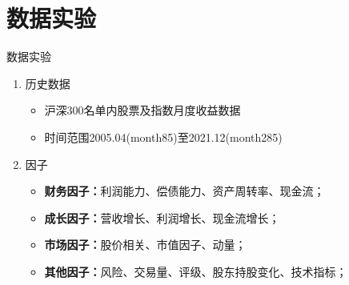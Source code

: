 \documentclass[CJK,aspectratio=43]{beamer}  %
\begin{document}
\section{数据实验}
\begin{frame}{数据实验}
	\begin{enumerate}
		\item 历史数据
		\begin{itemize}
			\item 沪深300名单内股票及指数月度收益数据
			\item 时间范围2005.04(month85)至2021.12(month285)
		\end{itemize}
		\item 因子
		\begin{itemize}
			\item \textbf{财务因子：}利润能力、偿债能力、资产周转率、现金流；
			\item \textbf{成长因子：}营收增长、利润增长、现金流增长；
			\item \textbf{市场因子：}股价相关、市值因子、动量；
			\item \textbf{其他因子：}风险、交易量、评级、股东持股变化、技术指标；
		\end{itemize}
	\end{enumerate}
	\begin{table}[htbp]
		\centering
		\label{tab:factors}%
		\caption{Factors}
	\end{table}%
\end{frame}
\end{document}
